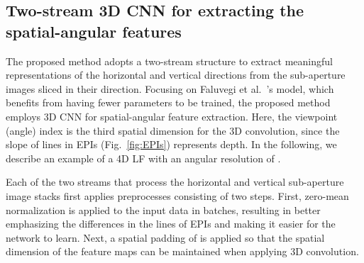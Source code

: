\documentclass[]{spie}
\newcommand{\jtextd}[1]{}
\begin{document}
\subsection{Two-stream 3D CNN for extracting the spatial-angular features}
\label{sec:two-stream}
\jtextd{
   提案手法では，水平方向と垂直方向の意味のある表現を抽出するために，2ストリーム構造を採用する．
   Faluv{\'e}giら~\cite{faluvegi20193d}
のモデルにおける
   学習パラメータ数の少なさに着目し，提案手法においても空間-角度特徴抽出のために3D CNNを用いる．
   ここで，EPIsにおける直線の傾きが奥行きを表すことから，
   3次元畳み込みのための第3の空間次元として視点（角度）インデックスを使用する．
以下では，の角度分解能を持つ4D LFを例として説明する．
}

The proposed method adopts a two-stream structure to extract 
meaningful representations of the horizontal and vertical directions
from the sub-aperture images sliced in their direction.
Focusing on Faluv{e}gi et al.~\cite{faluvegi20193d}'s model, which
benefits from having fewer parameters to be trained, the proposed
method employs 3D CNN for spatial-angular feature extraction.
Here, the viewpoint (angle) index is the third spatial
dimension for the 3D convolution, since the slope of lines in EPIs
(Fig.~\ref{fig:EPIs}) represents depth.
In the following, we describe an example of a 4D LF with an angular
resolution of .

\jtextd{
   提案方式を構成する2つのストリームでは，それぞれ2ステップの前処理を行う．
   まず，入力データに対し，バッチ単位でゼロ平均正規化を行う．
これによりEPIsの線がより強調され，ネットワークの学習が容易になる．
   次に，
3次元畳み込みが適用された際に特徴マップの空間次元を維持できるよう，
の空間パディングを適用する．
}

Each of the two streams that process the horizontal and vertical
sub-aperture image stacks first applies preprocesses consisting of two
steps.
First, zero-mean normalization is applied to the input data in
batches, resulting in better emphasizing the differences in the lines of EPIs
and making it easier for the network to learn.
Next, a spatial padding of  is applied so that the spatial
dimension of the feature maps can be maintained when applying 3D
convolution.


\jtextd{
   各ストリームは，ストライド幅が1，サイズがのカーネルを使用した
   3次元畳み込み層を4層連ねた構成をとる．
   出力する特徴マップ数は，最初の畳み込み層は32個，残り3層の畳み込み層は64個である．
   特徴マップのサイズは，4層の3次元畳み込み層によって，
ビューの数に対応する
次元は9から1に縮小され，
   空間次元は入力と同等のサイズに維持される．
}
\end{document}

